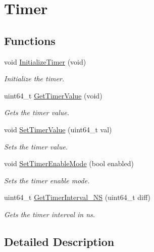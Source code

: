 \hypertarget{group__timer__hal}{}\section{Timer}
\label{group__timer__hal}
\subsection*{Functions}
\begin{DoxyCompactItemize}
\item 
void \hyperlink{group__timer__hal_gaa04f3990c781274ac259facaa575bc44}{Initialize\+Timer} (void)\hypertarget{group__timer__hal_gaa04f3990c781274ac259facaa575bc44}{}\label{group__timer__hal_gaa04f3990c781274ac259facaa575bc44}

\begin{DoxyCompactList}\small\item\em Initialize the timer. \end{DoxyCompactList}\item 
uint64\+\_\+t \hyperlink{group__timer__hal_ga95bc62dda82f3590195440cc17067f65}{Get\+Timer\+Value} (void)
\begin{DoxyCompactList}\small\item\em Gets the timer value. \end{DoxyCompactList}\item 
void \hyperlink{group__timer__hal_gaf6d02c653c7204dfa9955e471f7486c4}{Set\+Timer\+Value} (uint64\+\_\+t val)
\begin{DoxyCompactList}\small\item\em Sets the timer value. \end{DoxyCompactList}\item 
void \hyperlink{group__timer__hal_ga0bb612870623530416114907668d93e1}{Set\+Timer\+Enable\+Mode} (bool enabled)
\begin{DoxyCompactList}\small\item\em Sets the timer enable mode. \end{DoxyCompactList}\item 
uint64\+\_\+t \hyperlink{group__timer__hal_ga48d966c22298868762d5e2456dcbd2f8}{Get\+Timer\+Interval\+\_\+\+NS} (uint64\+\_\+t diff)
\begin{DoxyCompactList}\small\item\em Gets the timer interval in ns. \end{DoxyCompactList}\end{DoxyCompactItemize}


\subsection{Detailed Description}


